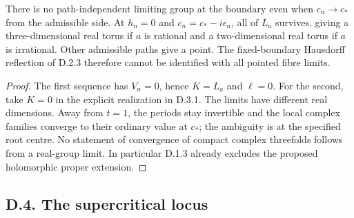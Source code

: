 \begin{corollary}\label{push:src:D.3.2}
There is no path-independent limiting group at the boundary even
when \(c_n\to c_*\) from the admissible side. At \(h_n=0\) and
\(c_n=c_*-i\epsilon_n\), all of \(L_a\) survives, giving a
three-dimensional real torus if \(a\) is rational and a
two-dimensional real torus if \(a\) is irrational. Other admissible
paths give a point. The fixed-boundary Hausdorff reflection of D.2.3
therefore cannot be identified with all pointed fibre limits.
\end{corollary}
\begin{proof}
The first sequence has \(V_n=0\), hence \(K=L_a\) and \(\ell=0\).
For the second, take \(K=0\) in the explicit realization in D.3.1.
The limits have different real dimensions. Away from \(t=1\), the
periods stay invertible and the local complex families converge to
their ordinary value at \(c_*\); the ambiguity is at the specified
root centre. No statement of convergence of compact complex
threefolds follows from a real-group limit. In particular D.1.3
already excludes the proposed holomorphic proper extension.
\end{proof}

\subsection{D.4. The supercritical locus}

